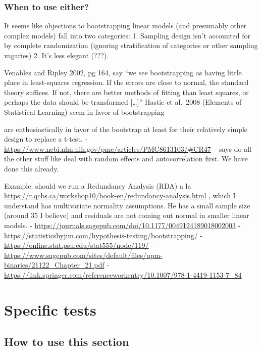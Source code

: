 \documentclass[
]{book}
\begin{document}
\hypertarget{when-to-use-either}{%
\section{When to use either?}\label{when-to-use-either}}

It seems like objections to bootstrapping linear models (and presumably other complex models) fall into two categories: 1. Sampling design isn't accounted for by complete randomization (ignoring stratification of categories or other sampling vagaries) 2. It's less elegant (???).

Venables and Ripley 2002, pg 164, say ``we see bootstrapping as having little place in least-squares regression. If the errors are close to normal, the standard theory suffices. If not, there are better methods of fitting than least squares, or perhaps the data should be transformed {[}\ldots{]}'' Hastie et al.~2008 (Elements of Statistical Learning) seem in favor of bootstrapping

\citet{johnston_bootstrap_2021} are enthusiastically in favor of the bootstrap at least for their relatively simple design to replace a t-test.
- \url{https://www.ncbi.nlm.nih.gov/pmc/articles/PMC8613103/\#CR47} -- says do all the other stuff like deal with random effects and autocorrelation first. We have done this already.

Example: should we run a Redundancy Analysis (RDA) a la \url{https://r.qcbs.ca/workshop10/book-en/redundancy-analysis.html} , which I understand has multivariate normality assumptions. He has a small sample size (around 35 I believe) and residuals are not coming out normal in smaller linear models.
- \url{https://journals.sagepub.com/doi/10.1177/0049124189018002003}
- \url{https://statisticsbyjim.com/hypothesis-testing/bootstrapping/}
- \url{https://online.stat.psu.edu/stat555/node/119/}
- \url{https://www.sagepub.com/sites/default/files/upm-binaries/21122_Chapter_21.pdf}
- \url{https://link.springer.com/referenceworkentry/10.1007/978-1-4419-1153-7_84}

\hypertarget{part-specific-tests}{%
\part{Specific tests}\label{part-specific-tests}}

\hypertarget{how-to-use-this-section}{%
\chapter*{How to use this section}\label{how-to-use-this-section}}
\end{document}
